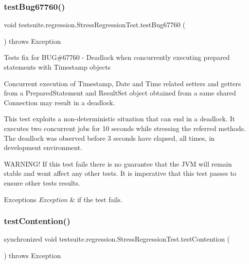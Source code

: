 \subsubsection{\texorpdfstring{test\+Bug67760()}{testBug67760()}}
{\footnotesize\ttfamily void testsuite.\+regression.\+Stress\+Regression\+Test.\+test\+Bug67760 (\begin{DoxyParamCaption}{ }\end{DoxyParamCaption}) throws Exception}

Tests fix for B\+UG\#67760 -\/ Deadlock when concurrently executing prepared statements with Timestamp objects

Concurrent execution of Timestamp, Date and Time related setters and getters from a Prepared\+Statement and Result\+Set object obtained from a same shared Connection may result in a deadlock.

This test exploits a non-\/deterministic situation that can end in a deadlock. It executes two concurrent jobs for 10 seconds while stressing the referred methods. The deadlock was observed before 3 seconds have elapsed, all times, in development environment.

W\+A\+R\+N\+I\+N\+G! If this test fails there is no guarantee that the J\+VM will remain stable and won\textquotesingle{}t affect any other tests. It is imperative that this test passes to ensure other tests results.


\begin{DoxyExceptions}{Exceptions}
{\em Exception} & if the test fails. \\
\hline
\end{DoxyExceptions}
\mbox{\label{classtestsuite_1_1regression_1_1_stress_regression_test_a9e52f4e90a98cc513dfd3318d348c531}} 
\subsubsection{\texorpdfstring{test\+Contention()}{testContention()}}
{\footnotesize\ttfamily synchronized void testsuite.\+regression.\+Stress\+Regression\+Test.\+test\+Contention (\begin{DoxyParamCaption}{ }\end{DoxyParamCaption}) throws Exception}


